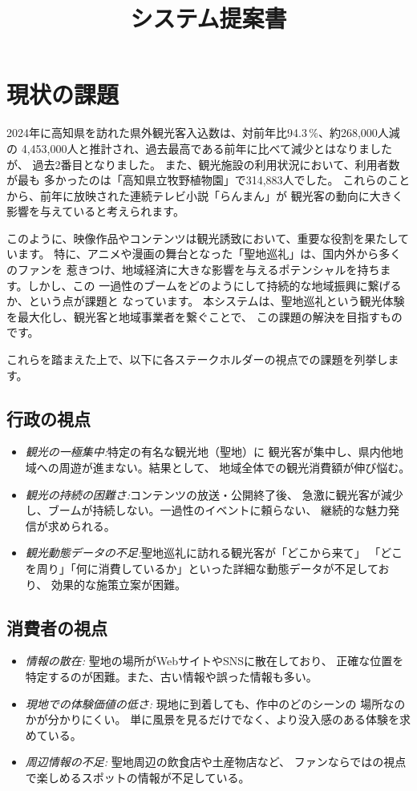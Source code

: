 \documentclass{docs}
\title{システム提案書}
\begin{document}
\section{現状の課題}\label{sec:issues}
2024年に高知県を訪れた県外観光客入込数は、対前年比94.3\,\%、約268,000人減の
4,453,000人と推計され、過去最高である前年に比べて減少とはなりましたが、
過去2番目となりました。
また、観光施設の利用状況において、利用者数が最も
多かったのは「高知県立牧野植物園」で314,883人でした\cite{kochi}。
これらのことから、前年に放映された連続テレビ小説「らんまん」が
観光客の動向に大きく影響を与えていると考えられます。

このように、映像作品やコンテンツは観光誘致において、重要な役割を果たしています。
特に、アニメや漫画の舞台となった「聖地巡礼」は、国内外から多くのファンを
惹きつけ、地域経済に大きな影響を与えるポテンシャルを持ちます。しかし、この
一過性のブームをどのようにして持続的な地域振興に繋げるか、という点が課題と
なっています。
本システムは、聖地巡礼という観光体験を最大化し、観光客と地域事業者を繋ぐことで、
この課題の解決を目指すものです。

これらを踏まえた上で、以下に各ステークホルダーの視点での課題を列挙します。
\subsection{行政の視点}
\begin{itemize}
	\item \emph{観光の一極集中:}特定の有名な観光地（聖地）に
	観光客が集中し、県内他地域への周遊が進まない。結果として、
	地域全体での観光消費額が伸び悩む。
	\item \emph{観光の持続の困難さ:}コンテンツの放送・公開終了後、
	急激に観光客が減少し、ブームが持続しない。一過性のイベントに頼らない、
	継続的な魅力発信が求められる。
	\item \emph{観光動態データの不足:}聖地巡礼に訪れる観光客が「どこから来て」
	「どこを周り」「何に消費しているか」といった詳細な動態データが不足しており、
	効果的な施策立案が困難。
\end{itemize}

\subsection{消費者の視点}
\begin{itemize}
	\item \emph{情報の散在:} 聖地の場所がWebサイトやSNSに散在しており、
	正確な位置を特定するのが困難。また、古い情報や誤った情報も多い。
	\item \emph{現地での体験価値の低さ:} 現地に到着しても、作中のどのシーンの
	場所なのかが分かりにくい。
	単に風景を見るだけでなく、より没入感のある体験を求めている。
	\item \emph{周辺情報の不足:} 聖地周辺の飲食店や土産物店など、
	ファンならではの視点で楽しめるスポットの情報が不足している。
\end{itemize}
\end{document}
